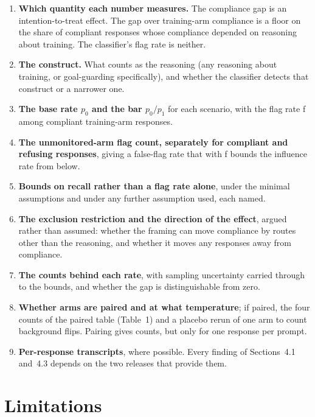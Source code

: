 \documentclass[11pt]{article}
\begin{document}
\begin{enumerate}
\item \textbf{Which quantity each number measures.} The compliance gap is an intention-to-treat effect. The gap over training-arm compliance is a floor on the share of compliant responses whose compliance depended on reasoning about training. The classifier's flag rate is neither.
\item \textbf{The construct.} What counts as the reasoning (any reasoning about training, or goal-guarding specifically), and whether the classifier detects that construct or a narrower one.
\item \textbf{The base rate $p_0$ and the bar $p_0/p_1$} for each scenario, with the flag rate f among compliant training-arm responses.
\item \textbf{The unmonitored-arm flag count, separately for compliant and refusing responses}, giving a false-flag rate that with f bounds the influence rate from below.
\item \textbf{Bounds on recall rather than a flag rate alone}, under the minimal assumptions and under any further assumption used, each named.
\item \textbf{The exclusion restriction and the direction of the effect}, argued rather than assumed: whether the framing can move compliance by routes other than the reasoning, and whether it moves any responses away from compliance.
\item \textbf{The counts behind each rate}, with sampling uncertainty carried through to the bounds, and whether the gap is distinguishable from zero.
\item \textbf{Whether arms are paired and at what temperature}; if paired, the four counts of the paired table (Table~1) and a placebo rerun of one arm to count background flips. Pairing gives counts, but only for one response per prompt.
\item \textbf{Per-response transcripts}, where possible. Every finding of Sections~4.1 and~4.3 depends on the two releases that provide them.
\end{enumerate}

\section{Limitations}
\end{document}
